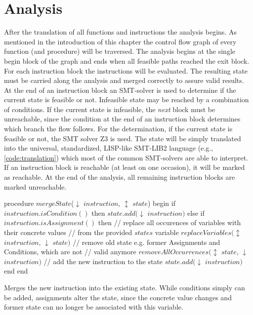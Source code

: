 \section{Analysis}
\label{sec:analysis}
After the translation of all functions and instructions the analysis begins. As mentioned in the introduction of this chapter the control flow graph of every function (and procedure) will be traversed. The analysis begins at the single begin block of the graph and ends when all feasible paths reached the exit block.  
For each instruction block the instructions will be evaluated. The resulting state must be carried along the analysis and merged correctly to assure valid results. At the end of an instruction block an SMT-solver is used to determine if the current state is feasible or not. Infeasible state may be reached by a combination of conditions. If the current state is infeasible, the \emph{next} block must be unreachable, since the condition at the end of an instruction block determines which branch the flow follows. 
For the determination, if the current state is feasible or not, the SMT solver Z3 \cite{demouraZ3EfficientSMT2008} is used. The state will be simply translated into the universal, standardized, LISP-like SMT-LIB2 language (e.g., \ref{code:translation}) which most of the common SMT-solvers are able to interpret. If an instruction block is reachable (at least on one occasion), it will be marked as reachable. At the end of the analysis, all remaining instruction blocks are marked unreachable.
\clearpage
\pagebreak
\begin{program}[h!]
	\begin{GenericCode}
procedure $mergeState$($\downarrow$ $instruction$, $\updownarrow$ $state$) begin
	if $instruction.isCondition()$ then
		$state.add($$\downarrow$ $instruction$$)$
	else if $instruction.isAssignment()$ then
		// replace all occurences of variables with their concrete values
		// from the provided $states$ variable
		$replaceVariables($$\updownarrow$ $instruction$, $\downarrow$ $state$$)$ 
		// remove old state e.g. former Assignments and Conditions, which are not
		// valid anymore
		$removeAllOccurrences($$\updownarrow$ $state$, $\downarrow$ $instruction$$)$
		// add the new instruction to the state
		$state.add($$\downarrow$ $instruction$$)$
	end 
end	\end{GenericCode}
	\caption{Merges the new instruction into the existing state. While conditions simply can be added, assignments alter the state, since the concrete value changes and former state can no longer be associated with this variable. }
\label{code:merge state}
\end{program}
